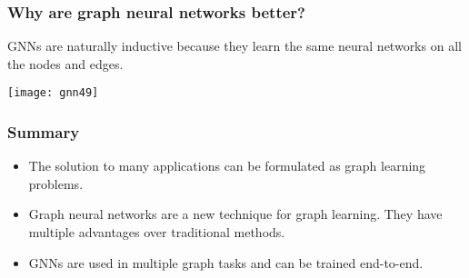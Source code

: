 \begin{frame}[fragile]\frametitle{Why are graph neural networks better?}

GNNs are naturally inductive because they learn the same neural networks on all the nodes and edges.


\begin{center}
\texttt{[image: gnn49]}
\end{center}	  

\end{frame}

\begin{frame}[fragile]\frametitle{Summary}

\begin{itemize}
\item The solution to many applications can be formulated as graph learning problems.
\item Graph neural networks are a new technique for graph learning. They have multiple advantages over traditional methods.
\item GNNs are used in multiple graph tasks and can be trained end-to-end.
\end{itemize}

\end{frame}
